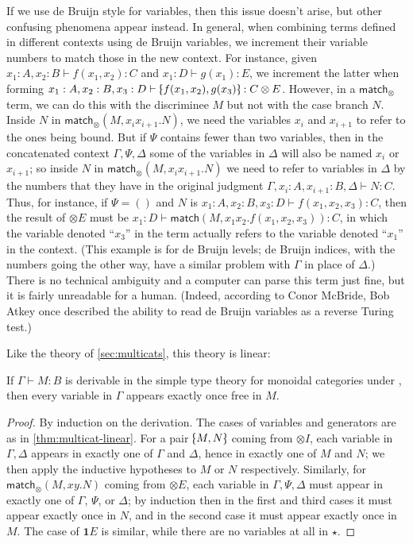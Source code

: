 \documentclass{book}
\let\types\vdash
\def\match{\mathsf{match}}
\def\one{\mathbf{1}}
\def\ott{\mathord{\star}}%
\let\tensor\otimes
\def\tensorI{\mathord{\tensor}I}
\def\tensorE{\mathord{\tensor}E}
\def\tpair#1#2{\text{\textlquill} #1,#2 \text{\textrquill}}%
\begin{document}
\begin{rmk}
  If we use de Bruijn style for variables, then this issue doesn't arise, but other confusing phenomena appear instead.
  In general, when combining terms defined in different contexts using de Bruijn variables, we increment their variable numbers to match those in the new context.
  For instance, given $x_1:A,x_2:B \types f(x_1,x_2):C$ and $x_1:D\types g(x_1):E$, we increment the latter when forming $x_1:A,x_2:B,x_3:D\types \tpair{f(x_1,x_2)}{g(x_3)}:C\tensor E$.
  However, in a $\match_\tensor$ term, we can do this with the discriminee $M$ but not with the case branch $N$.
  Inside $N$ in $\match_\tensor(M,x_i x_{i+1}.N)$, we need the variables $x_i$ and $x_{i+1}$ to refer to the ones being bound.
  But if $\Psi$ contains fewer than two variables, then in the concatenated context $\Gamma,\Psi,\Delta$ some of the variables in $\Delta$ will also be named $x_i$ or $x_{i+1}$; so inside $N$ in $\match_\tensor(M,x_i x_{i+1}.N)$ we need to refer to variables in $\Delta$ by the numbers that they have in the original judgment $\Gamma,x_i:A,x_{i+1}:B,\Delta\types N:C$.
  Thus, for instance, if $\Psi=()$ and $N$ is $x_1:A,x_2:B,x_3:D\types f(x_1,x_2,x_3):C$, then the result of $\tensorE$ must be $x_1:D \types \match(M,x_1 x_2.f(x_1,x_2,x_3)):C$, in which the variable denoted ``$x_3$'' in the term actually refers to the variable denoted ``$x_1$'' in the context.
  (This example is for de Bruijn levels; de Bruijn indices, with the numbers going the other way, have a similar problem with $\Gamma$ in place of $\Delta$.)
  There is no technical ambiguity and a computer can parse this term just fine, but it is fairly unreadable for a human.
  (Indeed, according to Conor McBride, Bob Atkey once described the ability to read de Bruijn variables as a reverse Turing test.)
\end{rmk}

Like the theory of \cref{sec:multicats}, this theory is linear:

\begin{lem}\label{thm:moncat-linear}
  If $\Gamma\types M:B$ is derivable in the simple type theory for monoidal categories under \cG, then every variable in $\Gamma$ appears exactly once free in $M$.
\end{lem}
\begin{proof}
  By induction on the derivation.
  The cases of variables and generators are as in \cref{thm:multicat-linear}.
  For a pair $\tpair M N$ coming from $\tensorI$, each variable in $\Gamma,\Delta$ appears in exactly one of $\Gamma$ and $\Delta$, hence in exactly one of $M$ and $N$; we then apply the inductive hypotheses to $M$ or $N$ respectively.
  Similarly, for $\match_\tensor(M,xy.N)$ coming from $\tensorE$, each variable in $\Gamma,\Psi,\Delta$ must appear in exactly one of $\Gamma$, $\Psi$, or $\Delta$; by induction then in the first and third cases it must appear exactly once in $N$, and in the second case it must appear exactly once in $M$.
  The case of $\one E$ is similar, while there are no variables at all in $\ott$.
\end{proof}
\end{document}
